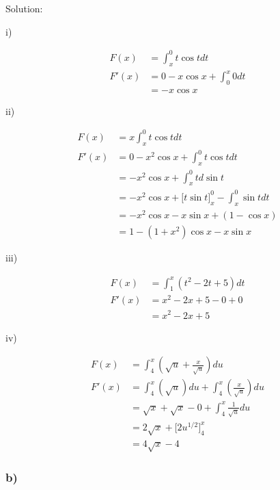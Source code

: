 \documentclass[letterpaper, 11pt]{article}
\newcommand{\1}{\mathds{1}}	%
\theoremstyle{definition}
\begin{document}
  Solution:

  i)

  \begin{align*}
    F(x)  & = \int_{x}^{0} t \cos t dt         \\
    F'(x) & = 0 - x \cos x + \int_{0}^{x} 0 dt \\
          & = -x\cos x
  \end{align*}

  ii)

  \begin{align*}
    F(x)  & = x\int_{x}^{0} t \cos t dt                                             \\
    F'(x) & = 0 - x ^{2}\cos x + \int_{x}^{0}t \cos t dt                            \\
          & = -x ^{2} \cos x + \int_{x}^{0}t d \sin t                               \\
          & = -x ^{2} \cos x + \Big[ t \sin t \Big]_{x}^{0} - \int_{x}^{0}\sin t dt \\
          & = -x ^{2} \cos x - x \sin x + (1 - \cos x)                              \\
          & = 1 - (1+x ^{2})\cos x - x \sin x
  \end{align*}

  iii)

  \begin{align*}
    F(x)  & = \int_{1}^{x}(t ^{2} - 2t + 5) dt \\
    F'(x) & = x ^{2} - 2x + 5 - 0+ 0           \\
          & = x ^{2} - 2x + 5
  \end{align*}

  iv)

  \begin{align*}
    F(x)  & = \int_{4}^{x}(\sqrt{u} + \frac{x}{\sqrt{u}}) du                 \\
    F'(x) & =\int_{4}^{x}(\sqrt{u}) du +\int_{4}^{x}( \frac{x}{\sqrt{u}}) du \\
          & = \sqrt{x} + \sqrt{x} - 0 + \int_{4}^{x}\frac{1}{\sqrt{u}} du    \\
          & = 2 \sqrt{x} + \Big[ 2 u ^{1/2} \Big]_{4}^{x}                    \\
          & = 4 \sqrt{x} - 4
  \end{align*}

  \subsubsection*{b)}
\end{document}
